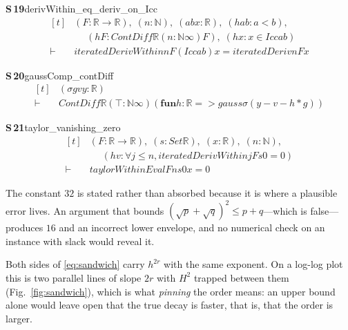 \documentclass[conference]{IEEEtran}
\theoremstyle{definition}
\newcommand{\lean}[1]{\textsf{\footnotesize #1}}
\begin{document}
\noindent\textbf{S\,19}\quad\lean{derivWithin\_eq\_deriv\_on\_Icc}
{\footnotesize\[ \begin{aligned}[t]
&(\mathit{F} : \mathbb{R} \to \mathbb{R} ),\; (\mathit{n} : \mathbb{N} ),\; (\mathit{a} \mathit{b} \mathit{x} : \mathbb{R} ),\; (\mathit{hab} : \mathit{a} < \mathit{b}),\\
&\quad \; (\mathit{hF} : \mathit{ContDiff} \mathbb{R} (\mathit{n} : \mathbb{N} \infty ) \mathit{F}),\; (\mathit{hx} : \mathit{x} \in \mathit{Icc} \mathit{a} \mathit{b})\\
\vdash\;&\mathit{iteratedDerivWithin} \mathit{n} \mathit{F} (\mathit{Icc} \mathit{a} \mathit{b}) \mathit{x} = \mathit{iteratedDeriv} \mathit{n} \mathit{F} \mathit{x}
\end{aligned} \]}

\noindent\textbf{S\,20}\quad\lean{gaussComp\_contDiff}
{\footnotesize\[ \begin{aligned}[t]
&(\sigma \mathit{g} \mathit{v} \mathit{y} : \mathbb{R} )\\
\vdash\;&\mathit{ContDiff} \mathbb{R} (⊤ : \mathbb{N} \infty ) (\mathbf{fun} \mathit{h} : \mathbb{R} => \mathit{gauss} \sigma (\mathit{y} - \mathit{v} - \mathit{h} * \mathit{g}))
\end{aligned} \]}

\noindent\textbf{S\,21}\quad\lean{taylor\_vanishing\_zero}
{\footnotesize\[ \begin{aligned}[t]
&(\mathit{F} : \mathbb{R} \to \mathbb{R} ),\; (\mathit{s} : \mathit{Set} \mathbb{R} ),\; (\mathit{x} : \mathbb{R} ),\; (\mathit{n} : \mathbb{N} ),\\
&\quad \; (\mathit{hv} : \forall \mathit{j} \leq \mathit{n}, \mathit{iteratedDerivWithin} \mathit{j} \mathit{F} \mathit{s} 0 = 0)\\
\vdash\;&\mathit{taylorWithinEval} \mathit{F} \mathit{n} \mathit{s} 0 \mathit{x} = 0
\end{aligned} \]}


The constant $32$ is stated rather than absorbed because it is where a plausible error
lives. An argument that bounds $(\sqrt{p}+\sqrt{q})^{2}\le p+q$---which is false---produces
$16$ and an incorrect lower envelope, and no numerical check on an instance with slack would
reveal it.

Both sides of \eqref{eq:sandwich} carry $h^{2r}$ with the same exponent. On a log-log plot
this is two parallel lines of slope $2r$ with $H^{2}$ trapped between them
(Fig.~\ref{fig:sandwich}), which is what \emph{pinning} the order means: an upper bound
alone would leave open that the true decay is faster, that is, that the order is larger.
\end{document}
